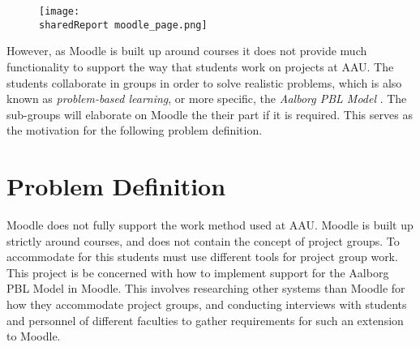 \begin{figure}[H]
\texttt{[image: \\sharedReport moodle\_page.png]}
\label{fig:MoodleCourse}
\end{figure}

However, as Moodle is built up around courses it does not provide much functionality to support the way that students work on projects at AAU. 
The students collaborate in groups in order to solve realistic problems, which is also known as \emph{problem-based learning}, or more specific, the \emph{Aalborg PBL Model} \citep{pbl}. The sub-groups will elaborate on Moodle the their part if it is required.
 This serves as the motivation for the following problem definition.

\section{Problem Definition}
\label{sec:problemDef}
Moodle does not fully support the work method used at AAU. 
Moodle is built up strictly around courses, and does not contain the concept of project groups. 
To accommodate for this students must use different tools for project group work.
This project is be concerned with how to implement support for the Aalborg PBL Model in Moodle. 
This involves researching other systems than Moodle for how they accommodate project groups, and conducting interviews with students and personnel of different faculties to gather requirements for such an extension to Moodle.

